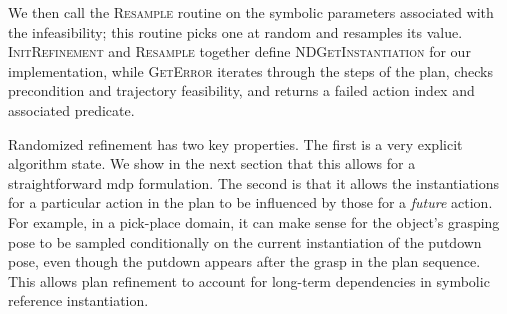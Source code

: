 We then call the \textsc{Resample} routine on the symbolic parameters
associated with the infeasibility; this routine picks one at random and
resamples its value. \textsc{InitRefinement} and \textsc{Resample} together define
\textsc{NDGetInstantiation} for our implementation, while \textsc{GetError} iterates
through the steps of the plan, checks precondition and trajectory feasibility, and returns
a failed action index and associated predicate.

Randomized refinement has two key properties. The first is a very explicit algorithm state.
We show in the next section that this allows for a straightforward {\sc mdp}
formulation. The second is that
it allows the instantiations for a particular action in
the plan to be influenced by those for a \emph{future} action. For example, in a
pick-place domain, it can make sense for the object's grasping pose to be sampled
conditionally on the current instantiation of the putdown pose, even though the putdown
appears after the grasp in the plan sequence. This allows plan refinement to account for
long-term dependencies in symbolic reference instantiation.